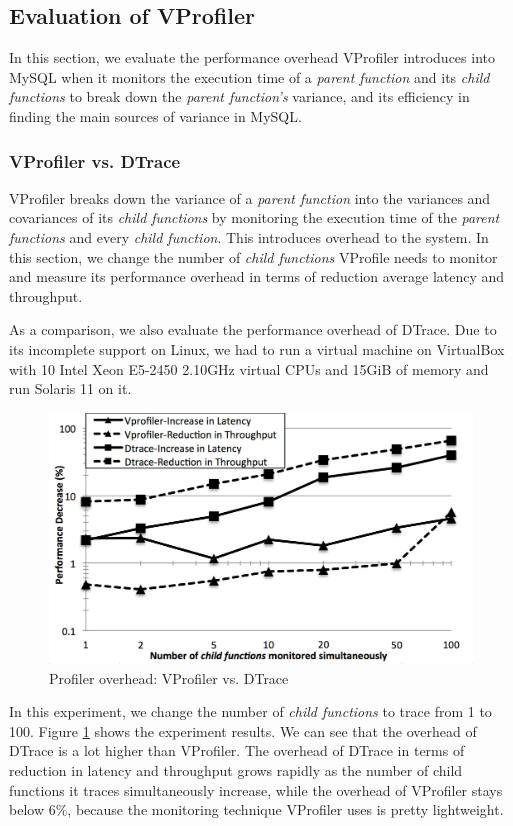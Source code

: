 \subsection{Evaluation of VProfiler}
In this section, we evaluate the performance overhead VProfiler introduces
into MySQL when it monitors the execution time of a \textit{parent function}
and its \textit{child functions} to break down the \textit{parent function's}
variance, and its efficiency in finding the main sources of variance in MySQL.

\subsubsection{VProfiler vs. DTrace}
VProfiler breaks down the variance of a \textit{parent function} into the
variances and covariances of its \textit{child functions} by monitoring the
execution time of the \textit{parent functions} and every \textit{child
function}. This introduces overhead to the system. In this section, we change
the number of \textit{child functions} VProfile needs to monitor and measure
its performance overhead in terms of reduction average latency and throughput.

As a comparison, we also evaluate the performance overhead of DTrace. Due to
its incomplete support on Linux, we had to run a virtual machine on VirtualBox
with 10 Intel Xeon E5-2450 2.10GHz virtual CPUs and 15GiB of memory and
run Solaris 11 on it.

\begin{figure}
    \centering
    \includegraphics[scale=0.3]{plots/overhead}
\caption{Profiler overhead: VProfiler vs. DTrace}
\label{fig:overhead}
\end{figure}

In this experiment, we change the number of \textit{child functions} to trace
from 1 to 100. Figure \ref{fig:overhead} shows the experiment results. We can
see that the overhead of DTrace is a lot higher than VProfiler. The overhead of
DTrace in terms of reduction in latency and throughput grows rapidly as the
number of child functions it traces simultaneously increase, while the overhead
of VProfiler stays below 6\%, because the monitoring technique VProfiler uses
is pretty lightweight.

